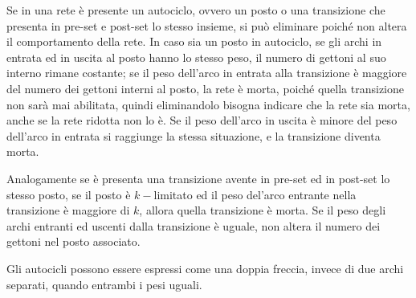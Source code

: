 \documentclass{article}
\numberwithin{equation}{subsection}
\begin{document}
Se in una rete è presente un autociclo, ovvero un posto o una transizione che presenta in pre-set e post-set lo stesso insieme, si può eliminare poiché non altera il 
comportamento della rete. 
In caso sia un posto in autociclo, se gli archi in entrata ed in uscita al posto hanno lo stesso peso, il numero di gettoni al suo interno rimane costante; se il peso dell'arco 
in entrata alla transizione è maggiore del numero dei gettoni interni al posto, la rete è morta, poiché quella transizione non sarà mai abilitata, quindi eliminandolo bisogna 
indicare che la rete sia morta, anche se la rete ridotta non lo è. Se il peso dell'arco in uscita è minore del peso dell'arco in entrata si raggiunge la stessa situazione, e 
la transizione diventa morta. 
\begin{center}
\end{center} 

Analogamente se è presenta una transizione avente in pre-set ed in post-set lo stesso posto, se il posto è $k-$limitato ed il peso del'arco entrante nella transizione è maggiore 
di $k$, allora quella transizione è morta. Se il peso degli archi entranti ed uscenti dalla transizione è uguale, non altera il numero dei gettoni nel posto associato. 
\begin{center}
\end{center} 
Gli autocicli possono essere espressi come una doppia freccia, invece di due archi separati, quando entrambi i pesi uguali. 
\end{document}
